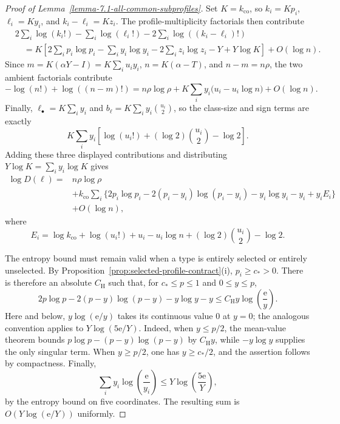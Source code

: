 \documentclass[a4paper,10pt,reqno]{amsart}
\numberwithin{equation}{section}
\theoremstyle{plain}
\theoremstyle{remark}
\begin{document}
\begin{proof}[Proof of Lemma~\ref{lemma-7.1-all-common-subprofiles}]
Set $K=k_{\mathrm{co}}$, so $k_i=Kp_i$, $\ell_i=Ky_i$, and
$k_i-\ell_i=Kz_i$. The profile-multiplicity factorials then contribute
\[
\begin{split}
 &2\sum_i\log(k_i!)-\sum_i\log(\ell_i!)
      -2\sum_i\log((k_i-\ell_i)!)\\
 &\quad={}
 K\!\left[
  2\sum_i p_i\log p_i-\sum_i y_i\log y_i
  -2\sum_i z_i\log z_i-Y+Y\log K
 \right]+O(\!\log n).
\end{split}
\]
Since $m=K(\alpha Y-I)=K\sum_i u_i y_i$, $n=K(\alpha-T)$, and
$n-m=n\rho$, the two ambient factorials contribute
\[
 -\log(n!)+\log((n-m)!)
 =n\rho\log\rho
   +K\sum_i y_i\bigl(u_i-u_i\log n\bigr)+O(\!\log n).
\]
Finally, $\ell_\bullet=K\sum_i y_i$ and
$b_\ell=K\sum_i y_i\binom{u_i}{2}$, so the class-size and sign terms are
exactly
\[
 K\sum_i y_i\left[
   \log(u_i!)+(\log 2)\binom{u_i}{2}-\log 2
 \right].
\]
Adding these three displayed contributions and distributing
$Y\log K=\sum_i y_i\log K$ gives
\begin{equation}
\begin{split}
 \log D(\ell)={}&n\rho\log\rho\\
 &+k_{\mathrm{co}}\sum_i\{2p_i\log p_i
     -2(p_i-y_i)\log(p_i-y_i)
     -y_i\log y_i-y_i+y_iE_i\}\\
 &+O(\!\log n),
\end{split}
 \label{eq:G-logD}
\end{equation}
where
\begin{equation}
 E_i=\log k_{\mathrm{co}}+\log(u_i!)+u_i-u_i\log n
       +(\log 2)\binom{u_i}{2}-\log 2.
 \label{eq:G-Ei}
\end{equation}

The entropy bound must remain valid when a type is entirely selected or
entirely unselected. By
Proposition~\ref{prop:selected-profile-contract}\textup{(i)},
$p_i\ge c_*>0$. There is therefore an absolute $C_{\mathrm H}$ such that,
for $c_*\le p\le1$ and $0\le y\le p$,
\begin{equation}
  2p\log p-2(p-y)\log(p-y)-y\log y-y
  \le C_{\mathrm H}y\log\!\left(\frac{\mathrm e}{y}\right).
  \label{eq:G-entropy}
\end{equation}
Here and below, \(y\log(\mathrm e/y)\) takes its continuous value \(0\) at
\(y=0\); the analogous convention applies to \(Y\log(5\mathrm e/Y)\).
Indeed, when $y\le p/2$, the mean-value theorem bounds
$p\log p-(p-y)\log(p-y)$ by $C_{\mathrm H}y$, while $-y\log y$ supplies the only
singular term. When $y\ge p/2$, one has $y\ge c_*/2$, and the assertion follows
by compactness. Finally,
\[
  \sum_i y_i\log\!\left(\frac{\mathrm e}{y_i}\right)
  \le
  Y\log\!\left(\frac{5\mathrm e}{Y}\right),
\]
by the entropy bound on five coordinates. The resulting sum is
$O(Y\log(\mathrm e/Y))$ uniformly.


\end{proof}
\end{document}
